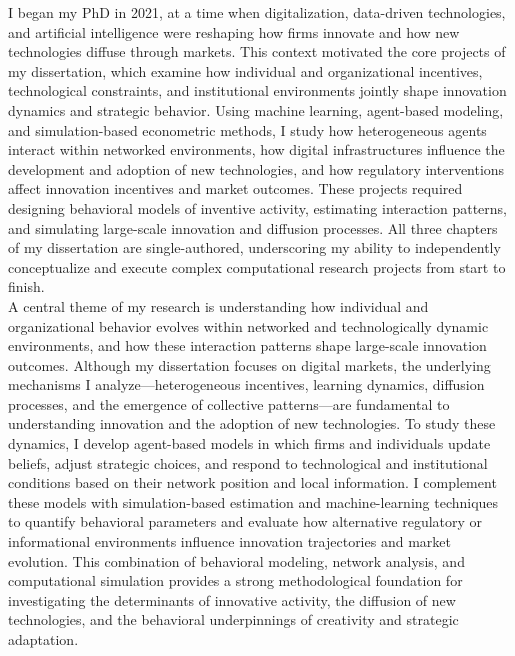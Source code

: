 \documentclass{nfr}
\begin{document}
I began my PhD in 2021, at a time when digitalization, data-driven technologies, and artificial intelligence were reshaping how firms innovate and how new technologies diffuse through markets. 
This context motivated the core projects of my dissertation, which examine how individual and organizational incentives, technological constraints, and institutional environments jointly shape innovation dynamics and strategic behavior. 
Using machine learning, agent-based modeling, and simulation-based econometric methods, I study how heterogeneous agents interact within networked environments, how digital infrastructures influence the development and adoption of new technologies, and how regulatory interventions affect innovation incentives and market outcomes. 
These projects required designing behavioral models of inventive activity, estimating interaction patterns, and simulating large-scale innovation and diffusion processes. 
All three chapters of my dissertation are single-authored, underscoring my ability to independently conceptualize and execute complex computational research projects from start to finish.\\

A central theme of my research is understanding how individual and organizational behavior evolves within networked and technologically dynamic environments, and how these interaction patterns shape large-scale innovation outcomes. 
Although my dissertation focuses on digital markets, the underlying mechanisms I analyze—heterogeneous incentives, learning dynamics, diffusion processes, and the emergence of collective patterns—are fundamental to understanding innovation and the adoption of new technologies. 
To study these dynamics, I develop agent-based models in which firms and individuals update beliefs, adjust strategic choices, and respond to technological and institutional conditions based on their network position and local information. 
I complement these models with simulation-based estimation and machine-learning techniques to quantify behavioral parameters and evaluate how alternative regulatory or informational environments influence innovation trajectories and market evolution. 
This combination of behavioral modeling, network analysis, and computational simulation provides a strong methodological foundation for investigating the determinants of innovative activity, the diffusion of new technologies, and the behavioral underpinnings of creativity and strategic adaptation.\\
\end{document}

